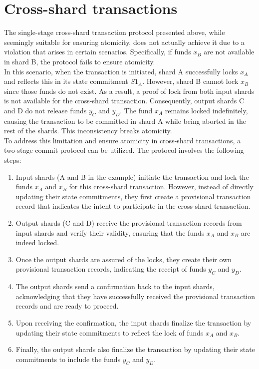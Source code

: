 \documentclass{report}
\begin{document}
\section{Cross-shard transactions}
The single-stage cross-shard transaction protocol presented above, while seemingly suitable for ensuring atomicity, does not actually achieve it due to a violation that arises in certain scenarios. Specifically, if funds $x_{B}$ are not available in shard B, the protocol fails to ensure atomicity.\\
In this scenario, when the transaction is initiated, shard A successfully locks $x_{A}$ and reflects this in its state commitment $S1_{A}$. However, shard B cannot lock $x_{B}$ since those funds do not exist. As a result, a proof of lock from both input shards is not available for the cross-shard transaction. Consequently, output shards C and D do not release funds $y_{C}$ and $y_{D}$. The fund $x_{A}$ remains locked indefinitely, causing the transaction to be committed in shard A while being aborted in the rest of the shards. This inconsistency breaks atomicity.\\
To address this limitation and ensure atomicity in cross-shard transactions, a two-stage commit protocol can be utilized. The protocol involves the following steps:\\
\begin{enumerate}
	\item Input shards (A and B in the example) initiate the transaction and lock the funds $x_{A}$ and $x_{B}$ for this cross-shard transaction. However, instead of directly updating their state commitments, they first create a provisional transaction record that indicates the intent to participate in the cross-shard transaction.
	\item Output shards (C and D) receive the provisional transaction records from input shards and verify their validity, ensuring that the funds $x_{A}$ and $x_{B}$ are indeed locked.
	\item Once the output shards are assured of the locks, they create their own provisional transaction records, indicating the receipt of funds $y_{C}$ and $y_{D}$.
	\item The output shards send a confirmation back to the input shards, acknowledging that they have successfully received the provisional transaction records and are ready to proceed.
	\item Upon receiving the confirmation, the input shards finalize the transaction by updating their state commitments to reflect the lock of funds $x_{A}$ and $x_{B}$.
	\item Finally, the output shards also finalize the transaction by updating their state commitments to include the funds $y_{C}$ and $y_{D}$.
\end{enumerate}
\end{document}

